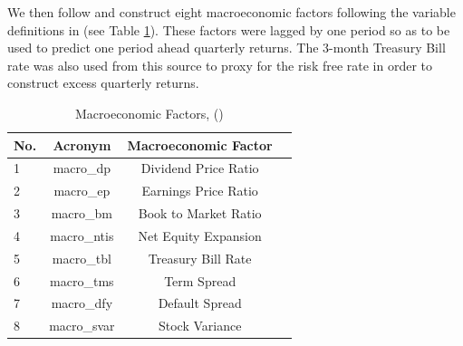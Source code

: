 \documentclass{article}
\begin{document}



We then follow \cite{gu_empirical_2019} and construct eight macroeconomic factors following the variable definitions in \cite{welch_comprehensive_2008} (see Table \ref{macro_factors}). These factors were lagged by one period so as to be used to predict one period ahead quarterly returns. The 3-month Treasury Bill rate was also used from this source to proxy for the risk free rate in order to construct excess quarterly returns. 

\begin{table}
	\caption{Macroeconomic Factors, (\cite{welch_comprehensive_2008})}
	\label{macro_factors}
	\begin{center}
		\begin{tabular}{lccc} \hline
			No. & Acronym & Macroeconomic Factor \\ \hline
			1 & macro\_dp & Dividend Price Ratio \\
			2 & macro\_ep & Earnings Price Ratio \\
			3 & macro\_bm & Book to Market Ratio \\
			4 & macro\_ntis & Net Equity Expansion \\
			5 & macro\_tbl & Treasury Bill Rate \\
			6 & macro\_tms & Term Spread \\
			7 & macro\_dfy & Default Spread \\
			8 & macro\_svar & Stock Variance \\ \hline
		\end{tabular}
	\end{center}
\end{table}
\end{document}
